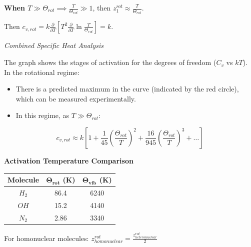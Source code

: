 \documentclass[12pt,a4paper]{report}
\newcommand{\esp}{\vspace{0.5cm}}
\begin{document}
	\esp
	
	\textbf{When $T \gg \Theta_{rot} \implies \frac{T}{\Theta_{rot}} \gg 1$}, then $z_1^{rot} \approx \frac{T}{\Theta_{rot}}$.
	
	\esp
	
	Then $c_{v,rot} = k \frac{\partial}{\partial T} \left[ T^2 \frac{\partial}{\partial T} \ln \frac{T}{\Theta_{rot}} \right] = k$.
	
	\esp
	
	\begin{center}
		\textit{Combined Specific Heat Analysis}
	\end{center}
	
	\esp
	
	The graph shows the stages of activation for the degrees of freedom ($C_v$ vs $kT$). In the rotational regime:
	\begin{itemize}
		\item There is a predicted maximum in the curve (indicated by the red circle), which can be measured experimentally.
		\item In this regime, as $T \gg \Theta_{rot}$:
	\end{itemize}
	
	\begin{equation}
		c_{v,rot} \approx k \left[ 1 + \frac{1}{45} \left( \frac{\Theta_{rot}}{T} \right)^2 + \frac{16}{945} \left( \frac{\Theta_{rot}}{T} \right)^3 + \dots \right]
	\end{equation}
	
	\esp
	
	\textbf{Activation Temperature Comparison}
	
	\begin{table}[h]
		\centering
		\begin{tabular}{|c|c|c|}
			\hline
			\textbf{Molecule} & $\mathbf{\Theta_{rot}}$ (K) & $\mathbf{\Theta_{vib}}$ (K) \\ \hline
			$H_2$             & 86.4                        & 6240                       \\ \hline
			$OH$              & 15.2                        & 4140                       \\ \hline
			$N_2$             & 2.86                        & 3340                       \\ \hline
		\end{tabular}
	\end{table}
	
	\esp
	
	For homonuclear molecules: $z_{homonuclear}^{rot} = \frac{z_{heteronuclear}^{rot}}{2}$
	
\end{document}
